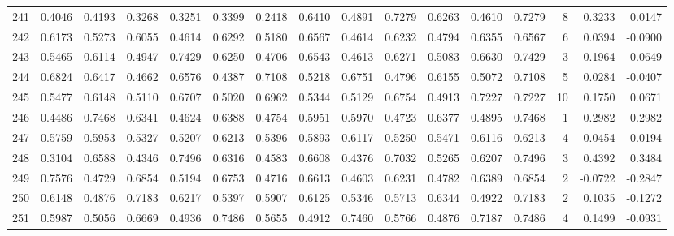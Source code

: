 \begin{tabular}{lrrrrrrrrrrrrrrr}
241 &      0.4046 &  0.4193 &  0.3268 &  0.3251 &  0.3399 &  0.2418 &  0.6410 &  0.4891 &  0.7279 &  0.6263 &   0.4610 &     0.7279 &      8 &                    0.3233 &                     0.0147 \\
242 &      0.6173 &  0.5273 &  0.6055 &  0.4614 &  0.6292 &  0.5180 &  0.6567 &  0.4614 &  0.6232 &  0.4794 &   0.6355 &     0.6567 &      6 &                    0.0394 &                    -0.0900 \\
243 &      0.5465 &  0.6114 &  0.4947 &  0.7429 &  0.6250 &  0.4706 &  0.6543 &  0.4613 &  0.6271 &  0.5083 &   0.6630 &     0.7429 &      3 &                    0.1964 &                     0.0649 \\
244 &      0.6824 &  0.6417 &  0.4662 &  0.6576 &  0.4387 &  0.7108 &  0.5218 &  0.6751 &  0.4796 &  0.6155 &   0.5072 &     0.7108 &      5 &                    0.0284 &                    -0.0407 \\
245 &      0.5477 &  0.6148 &  0.5110 &  0.6707 &  0.5020 &  0.6962 &  0.5344 &  0.5129 &  0.6754 &  0.4913 &   0.7227 &     0.7227 &     10 &                    0.1750 &                     0.0671 \\
246 &      0.4486 &  0.7468 &  0.6341 &  0.4624 &  0.6388 &  0.4754 &  0.5951 &  0.5970 &  0.4723 &  0.6377 &   0.4895 &     0.7468 &      1 &                    0.2982 &                     0.2982 \\
247 &      0.5759 &  0.5953 &  0.5327 &  0.5207 &  0.6213 &  0.5396 &  0.5893 &  0.6117 &  0.5250 &  0.5471 &   0.6116 &     0.6213 &      4 &                    0.0454 &                     0.0194 \\
248 &      0.3104 &  0.6588 &  0.4346 &  0.7496 &  0.6316 &  0.4583 &  0.6608 &  0.4376 &  0.7032 &  0.5265 &   0.6207 &     0.7496 &      3 &                    0.4392 &                     0.3484 \\
249 &      0.7576 &  0.4729 &  0.6854 &  0.5194 &  0.6753 &  0.4716 &  0.6613 &  0.4603 &  0.6231 &  0.4782 &   0.6389 &     0.6854 &      2 &                   -0.0722 &                    -0.2847 \\
250 &      0.6148 &  0.4876 &  0.7183 &  0.6217 &  0.5397 &  0.5907 &  0.6125 &  0.5346 &  0.5713 &  0.6344 &   0.4922 &     0.7183 &      2 &                    0.1035 &                    -0.1272 \\
251 &      0.5987 &  0.5056 &  0.6669 &  0.4936 &  0.7486 &  0.5655 &  0.4912 &  0.7460 &  0.5766 &  0.4876 &   0.7187 &     0.7486 &      4 &                    0.1499 &                    -0.0931 \\

\end{tabular}
